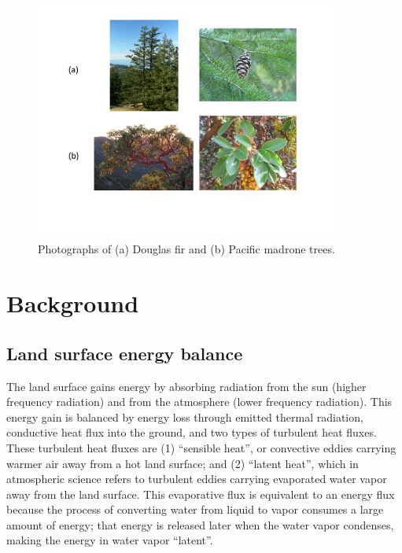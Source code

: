 \begin{figure}
\includegraphics[width=0.9\textwidth]{ch0-introduction/tree_pics.pdf}
\caption{Photographs of (a) Douglas fir and (b) Pacific madrone trees.}
\label{fig:intro_treepics}
\end{figure}

\section{Background}

\subsection{Land surface energy balance}

The land surface gains energy by absorbing radiation from the sun (higher frequency radiation) and from the atmosphere (lower frequency radiation).  This energy gain is balanced by energy loss through emitted thermal radiation, conductive heat flux into the ground, and two types of turbulent heat fluxes.  These turbulent heat fluxes are (1) ``sensible heat'', or convective eddies carrying warmer air away from a hot land surface; and (2) ``latent heat'', which in atmospheric science refers to turbulent eddies carrying evaporated water vapor away from the land surface.  This evaporative flux is equivalent to an energy flux because the process of converting water from liquid to vapor consumes a large amount of energy; that energy is released later when the water vapor condenses, making the energy in water vapor ``latent''.

